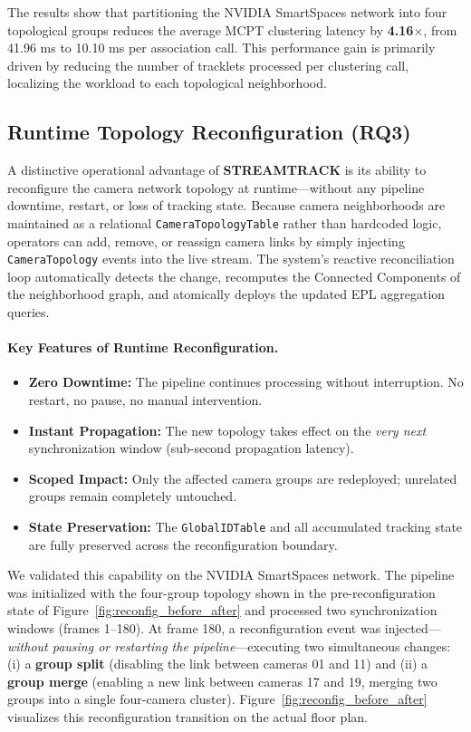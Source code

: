 \documentclass[review]{elsarticle}
\begin{document}
The results show that partitioning the NVIDIA SmartSpaces network into four topological groups reduces the average MCPT clustering latency by \textbf{4.16$\times$}, from 41.96 ms to 10.10 ms per association call. This performance gain is primarily driven by reducing the number of tracklets processed per clustering call, localizing the workload to each topological neighborhood.

\subsection{Runtime Topology Reconfiguration (RQ3)}

A distinctive operational advantage of \textbf{STREAMTRACK} is its ability to reconfigure the camera network topology at runtime---without any pipeline downtime, restart, or loss of tracking state. Because camera neighborhoods are maintained as a relational \texttt{CameraTopologyTable} rather than hardcoded logic, operators can add, remove, or reassign camera links by simply injecting \texttt{CameraTopology} events into the live stream. The system's reactive reconciliation loop automatically detects the change, recomputes the Connected Components of the neighborhood graph, and atomically deploys the updated EPL aggregation queries.

\paragraph{Key Features of Runtime Reconfiguration.}
\begin{itemize}[leftmargin=*]
    \item \textbf{Zero Downtime:} The pipeline continues processing without interruption. No restart, no pause, no manual intervention.
    \item \textbf{Instant Propagation:} The new topology takes effect on the \emph{very next} synchronization window (sub-second propagation latency).
    \item \textbf{Scoped Impact:} Only the affected camera groups are redeployed; unrelated groups remain completely untouched.
    \item \textbf{State Preservation:} The \texttt{GlobalIDTable} and all accumulated tracking state are fully preserved across the reconfiguration boundary.
\end{itemize}

We validated this capability on the NVIDIA SmartSpaces network. The pipeline was initialized with the four-group topology shown in the pre-reconfiguration state of Figure~\ref{fig:reconfig_before_after} and processed two synchronization windows (frames 1--180). At frame 180, a reconfiguration event was injected---\emph{without pausing or restarting the pipeline}---executing two simultaneous changes: (i) a \textbf{group split} (disabling the link between cameras 01 and 11) and (ii) a \textbf{group merge} (enabling a new link between cameras 17 and 19, merging two groups into a single four-camera cluster). Figure~\ref{fig:reconfig_before_after} visualizes this reconfiguration transition on the actual floor plan.
\end{document}
